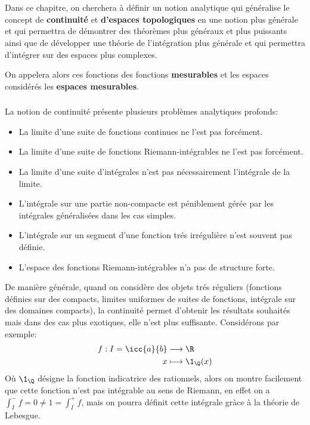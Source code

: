 \chapter*{} %
Dans ce chapitre, on cherchera à définir un notion analytique qui généralise le concept de \textbf{continuité} et \textbf{d'espaces topologiques} en une notion plus générale et qui permettra de démontrer des théorèmes plus généraux et plus puissants ainsi que de développer une théorie de l'intégration plus générale et qui permettra d'intégrer sur des espaces plus complexes.\<

On appelera alors ces fonctions des fonctions \textbf{mesurables} et les espaces considérés les \textbf{espaces mesurables}.

\subsection*{}
La notion de continuité présente plusieurs problèmes analytiques profonds:
\begin{itemize}
   \item La limite d'une suite de fonctions continues ne l'est pas forcément.
   \item La limite d'une suite de fonctions Riemann-intégrables ne l'est pas forcément.
   \item La limite d'une suite d'intégrales n'est pas nécessairement l'intégrale de la limite.
   \item L'intégrale sur une partie non-compacte est péniblement gérée par les intégrales généralisées dans les cas simples.
   \item L'intégrale sur un segment d'une fonction trés irrégulière n'est souvent pas définie.
   \item L'espace des fonctions Riemann-intégrables n'a pas de structure forte.
\end{itemize}
De manière générale, quand on considère des objets trés réguliers (fonctions définies sur des compacts, limites uniformes de suites de fonctions, intégrale sur des domaines compacts), la continuité permet d'obtenir les résultats souhaités mais dans des cas plus exotiques, elle n'est plus suffisante. Considérons par exemple:
\[
   \begin{aligned}
      f : I = \icc{a}{b} &\longrightarrow \R \\
      x &\longmapsto \1_\Q(x)
   \end{aligned}
\]
Où \(\1_\Q\) désigne la fonction indicatrice des rationnels, alors on montre facilement que cette fonction n'est pas intégrable au sens de Riemann, en effet on a \(\displaystyle\int_I^-{f} = 0 \neq 1 = \displaystyle\int_I^+{f}\), mais on pourra définit cette intégrale gràce à la théorie de Lebesgue.

